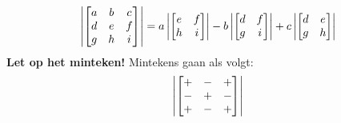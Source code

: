 \[
    \det{
        a & b & c \\
        d & e & f \\
        g & h & i \\
    }
    = a \det{e & f \\ h & i} - b \det{d & f \\ g & i} + c \det{d & e \\ g & h}
\]
\textbf{Let op het minteken!} Mintekens gaan als volgt:
\[
    \det{
        + & - & + \\
        - & + & - \\
        + & - & +
    }
\]